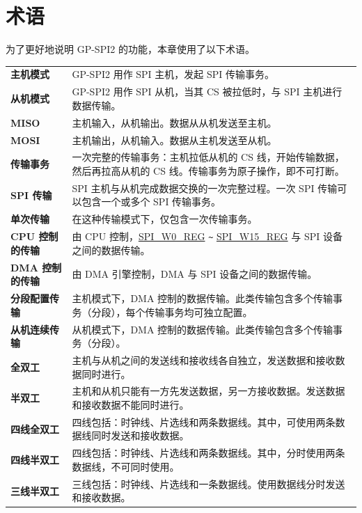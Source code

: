 \section{术语}

为了更好地说明 GP-SPI2 的功能，本章使用了以下术语。 

\begin{longtable}[c]{ R{4cm} p{10cm} }

\textbf{主机模式}     & GP-SPI2 用作 SPI 主机，发起 SPI 传输事务。\\ 
\textbf{从机模式}      & GP-SPI2 用作 SPI 从机，当其 CS 被拉低时，与 SPI 主机进行数据传输。\\
\textbf{MISO}       & 主机输入，从机输出。数据从从机发送至主机。\\
\textbf{MOSI}  & 主机输出，从机输入。数据从主机发送至从机。\\ 
\textbf{传输事务} & 一次完整的传输事务：主机拉低从机的 CS 线，开始传输数据，然后再拉高从机的 CS 线。传输事务为原子操作，即不可打断。\\
\textbf{SPI 传输} & SPI 主机与从机完成数据交换的一次完整过程。一次 SPI 传输可以包含一个或多个 SPI 传输事务。\\
\textbf{单次传输} & 在这种传输模式下，仅包含一次传输事务。\\
\textbf{CPU 控制的传输}& 由 CPU 控制，\hyperref[regdesc:SPIW0REG]{SPI\_W0\_REG} \verb+~+ \hyperref[regdesc:SPIW15REG]{SPI\_W15\_REG} 与 SPI 设备之间的数据传输。\\
\textbf{DMA 控制的传输}& 由 DMA 引擎控制，DMA 与 SPI 设备之间的数据传输。\\
\textbf{分段配置传输}& 主机模式下，DMA 控制的数据传输。此类传输包含多个传输事务（分段），每个传输事务均可独立配置。\\
\textbf{从机连续传输} & 从机模式下，DMA 控制的数据传输。此类传输包含多个传输事务（分段）。\\
\textbf{全双工} & 主机与从机之间的发送线和接收线各自独立，发送数据和接收数据同时进行。\\
\textbf{半双工} & 主机和从机只能有一方先发送数据，另一方接收数据。发送数据和接收数据不能同时进行。\\
\textbf{四线全双工} & 四线包括：时钟线、片选线和两条数据线。其中，可使用两条数据线同时发送和接收数据。\\
\textbf{四线半双工} & 四线包括：时钟线、片选线和两条数据线。其中，分时使用两条数据线，不可同时使用。\\
\textbf{三线半双工} & 三线包括：时钟线、片选线和一条数据线。使用数据线分时发送和接收数据。\\

\end{longtable}
